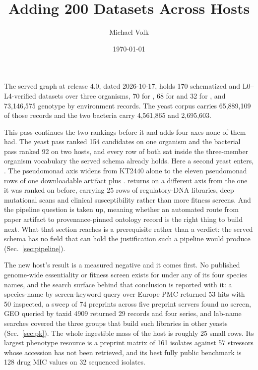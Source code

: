 \documentclass[10pt,a4paper]{article}
\title{\vspace{-1.5em}Adding 200 Datasets Across Hosts}
\author{Michael Volk}
\date{\today}
\begin{document}
\maketitle
\thispagestyle{empty}

\noindent
The served graph at release 4.0, dated 2026-10-17, holds 170 schematized and
L0--L4-verified datasets over three organisms, 70 for , 68 for
 and 32 for , and 73,146,575 genotype by
environment records. The yeast corpus carries 65,889,109 of those records and the two
bacteria carry 4,561,865 and 2,695,603.

This pass continues the two rankings before it and adds four axes none of them had. The
yeast pass ranked 154 candidates on one organism and the bacterial pass ranked 92 on two
hosts, and every row of both sat inside the three-member organism vocabulary the served
schema already holds. Here a second yeast enters, . The pseudomonad
axis widens from KT2440 alone to the eleven pseudomonad rows of one downloadable artifact plus
.  returns on a different axis from the one
it was ranked on before, carrying 25 rows of regulatory-DNA libraries, deep mutational scans
and clinical susceptibility rather than more fitness screens. And the pipeline question is
taken up, meaning whether an automated route from paper artifact to provenance-pinned ontology
record is the right thing to build next. What that section reaches is a prerequisite rather
than a verdict: the served schema has no field that can hold the justification such a pipeline
would produce (Sec.~\ref{sec:pipeline}).

The new host's result is a measured negative and it comes first. No published genome-wide
essentiality or fitness screen exists for  under any of its four species
names, and the search surface behind that conclusion is reported with it: a species-name by
screen-keyword query over Europe PMC returned 53 hits with 50 inspected, a sweep of 74
preprints across five preprint servers found no screen, GEO queried by taxid 4909 returned 29
records and four series, and lab-name searches covered the three groups that build such
libraries in other yeasts (Sec.~\ref{sec:pk}). The whole ingestible mass of the host is roughly
25 small rows. Its
largest phenotype resource is a preprint matrix of 161 isolates against 57 stressors whose
accession has not been retrieved, and its best fully public benchmark is 128 drug MIC values
on 32 sequenced isolates.
\end{document}
